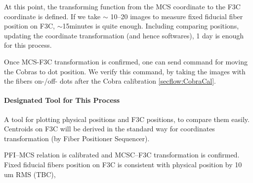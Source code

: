 At this point, the transforming function from the MCS coordinate to the F3C coordinate is defined.
If we take $\sim$ 10--20 images to measure fixed fiducial fiber position on F3C, $\sim$15minutes  is quite enough. 
Including comparing positions, updating the coordinate transformation (and hence softwares), 1 day is enough for this process.

Once MCS-F3C transformation is confirmed, one can send command for moving the Cobras to dot position.
We verify this command, by taking the images with the fibers on-/off- dots after the Cobra calibration \ref{secflow:CobraCal}.

\paragraph{Designated Tool for This Process}
A tool for plotting physical positions and F3C positions, to compare them easily.
Centroids on F3C will be derived in the standard way for coordinates transformation (by Fiber Positioner Sequencer).

\begin{itembox}[l]{}
PFI--MCS relation is calibrated and MCSC--F3C transformation is confirmed. \\
Fixed fiducial fibers position on F3C is consistent with physical position by 10 um RMS (TBC), 

\end{itembox}